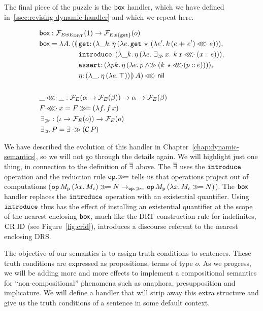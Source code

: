 The final piece of the puzzle is the $\textsf{box}$ handler, which we have defined
in~\ref{ssec:revising-dynamic-handler} and which we repeat here.

\begin{align*}
  &\BOX :\FF_{E \uplus E_\DRT}(1) \to \FF_{E \uplus \{\op{get}\}}(o) \\
  &\BOX = \lam{A}{(\ap{\begin{aligned}[t]\lban
  &\onto{\op{get}}{(\lam{\_ k}{\etaE{(\lam{e}{\app{\op{get}}{\star}{(\lam{e'}{\ap{k}{(e \cat e')} \apll e})}})}})}, \\
  &\onto{\op{introduce}}{(\lam{\_ k}{\etaE{(\lam{e}{\existsr x.\ \ap{k}{x} \apll (x \cons e)})}})}, \\
  &\onto{\op{assert}}{(\lam{p k}{\etaE{(\lam{e}{p \andr (\ap{k}{\star} \apll (p \cons e))})}})}, \\
  &\onto{\eta}{(\lam{\_}{\etaE{(\lam{e}{\top})}})}\rban}{A}) \apll \nil
    \end{aligned}} \\
  \\
  &\_ \apll \_ : \FF_E(\alpha \to \FF_E(\beta)) \to \alpha \to \FF_E(\beta) \\
  &F \apll x = F \hsbind (\lam{f}{\ap{f}{x}}) \\
  &\existsr : (\iota \to \FF_E(o)) \to  \FF_E(o) \\
  &\existsr P = \exists \apr (\ap{\CC}{P})
\end{align*}

We have described the evolution of this handler in
Chapter~\ref{chap:dynamic-semantics}, so we will not go through the details
again. We will highlight just one thing, in connection to the definition of
$\mathop{\overline{\exists}}$ above. The $\mathop{\overline{\exists}}$ uses the $\mathtt{introduce}$ operation and
the reduction rule $\mathtt{op}.\mathbin{\gg\!=}$ tells us that operations project out
of computations
($\mathtt{op}\,M_{\mathrm{p}}\,(\lambda x.\, M_{\mathrm{c}}) \mathbin{\gg\!=} N
\to_{\mathtt{op}.\mathbin{\gg\!=}} \mathtt{op}\,M_{\mathrm{p}}\,(\lambda x.\, M_{\mathrm{c}} \mathbin{\gg\!=}
    N)$). The $\textsf{box}$ handler replaces the $\mathtt{introduce}$ operation with
an existential quantifier. Using $\mathtt{introduce}$ thus has the effect of
installing an existential quantifier at the scope of the nearest enclosing
$\textsf{box}$, much like the DRT construction rule for indefinites, $\mathrm{CR.ID}$ (see
Figure~\ref{fig:crid}), introduces a discourse referent to the nearest
enclosing DRS.

The objective of our semantics is to assign truth conditions to
sentences. These truth conditions are expressed as propositions, terms of
type $o$. As we progress, we will be adding more and more effects to
implement a compositional semantics for ``non-compositional'' phenomena
such as anaphora, presupposition and implicature. We will define a handler
that will strip away this extra structure and give us the truth conditions
of a sentence in some default context.

